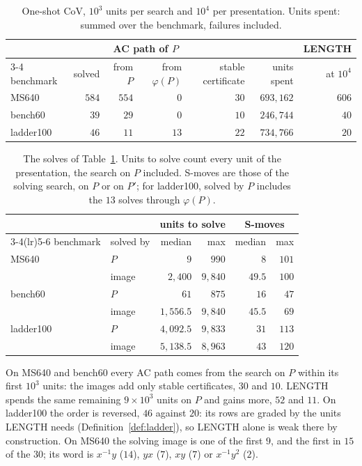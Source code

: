 \begin{table}[ht]
\centering
\small
\begin{tabular}{lrrrrrr}
\toprule
& & \multicolumn{2}{c}{AC path of $P$} & & & LENGTH\\
\cmidrule(lr){3-4}
benchmark & solved & from $P$ & from $\varphi(P)$ & stable certificate & units spent & at $10^4$\\
\midrule
MS640 & $584$ & $554$ & $0$ & $30$ & $693{,}162$ & $606$\\
bench60 & $39$ & $29$ & $0$ & $10$ & $246{,}744$ & $40$\\
ladder100 & $46$ & $11$ & $13$ & $22$ & $734{,}766$ & $20$\\
\bottomrule
\end{tabular}
\caption{One-shot CoV, $10^3$ units per search and $10^4$ per presentation. Units spent: summed over the benchmark,
failures included.}
\label{tab:cov_oneshot}
\end{table}

\begin{table}[ht]
\centering
\small
\begin{tabular}{llrrrr}
\toprule
& & \multicolumn{2}{c}{units to solve} & \multicolumn{2}{c}{S-moves}\\
\cmidrule(lr){3-4}\cmidrule(lr){5-6}
benchmark & solved by & median & max & median & max\\
\midrule
MS640 & $P$ & $9$ & $990$ & $8$ & $101$\\
& image & $2{,}400$ & $9{,}840$ & $49.5$ & $100$\\
bench60 & $P$ & $61$ & $875$ & $16$ & $47$\\
& image & $1{,}556.5$ & $9{,}840$ & $45.5$ & $69$\\
ladder100 & $P$ & $4{,}092.5$ & $9{,}833$ & $31$ & $113$\\
& image & $5{,}138.5$ & $8{,}963$ & $43$ & $120$\\
\bottomrule
\end{tabular}
\caption{The solves of Table~\ref{tab:cov_oneshot}. Units to solve count every unit of the presentation, the search on
$P$ included. S-moves are those of the solving search, on $P$ or on $P'$; for ladder100, solved by $P$ includes the
$13$ solves through $\varphi(P)$.}
\label{tab:cov_oneshot_cost}
\end{table}

On MS640 and bench60 every AC path comes from the search on $P$ within its first $10^3$ units: the images add only
stable certificates, $30$ and $10$. LENGTH spends the same remaining $9\times10^3$ units on $P$ and gains more, $52$
and $11$. On ladder100 the order is reversed, $46$ against $20$: its rows are graded by the units LENGTH needs
(Definition~\ref{def:ladder}), so LENGTH alone is weak there by construction. On MS640 the solving image is one of the
first $9$, and the first in $15$ of the $30$; its word is $x^{-1}y$ ($14$), $yx$ ($7$), $xy$ ($7$) or $x^{-1}y^{2}$
($2$).

